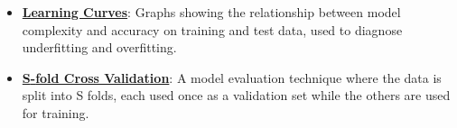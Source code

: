 \documentclass{article}%
\begin{document}
\begin{itemize}[leftmargin=*]
\item \href{https://purdue.brightspace.com/d2l/common/assets/pdfjs-d2l-dist/1.0.14-legacy/web/viewer.html?file=\%2Fcontent\%2Fenforced\%2F1095467-wl.202510.CS.24300.001\%2F10L1-CrossValidation.pdf\%3Fou\%3D1095467\&lang=en-us\&container=d2l-fileviewer-rendered-pdf\&fullscreen=d2l-fileviewer-rendered-pdf-dialog\&height=667#page=20}{\textbf{Learning Curves}}: Graphs showing the relationship between model complexity and accuracy on training and test data, used to diagnose underfitting and overfitting.%
\item \href{https://purdue.brightspace.com/d2l/common/assets/pdfjs-d2l-dist/1.0.14-legacy/web/viewer.html?file=\%2Fcontent\%2Fenforced\%2F1095467-wl.202510.CS.24300.001\%2F10L1-CrossValidation.pdf\%3Fou\%3D1095467\&lang=en-us\&container=d2l-fileviewer-rendered-pdf\&fullscreen=d2l-fileviewer-rendered-pdf-dialog\&height=667#page=25}{\textbf{S{-}fold Cross Validation}}: A model evaluation technique where the data is split into S folds, each used once as a validation set while the others are used for training.%
\end{itemize}%
\end{document}
